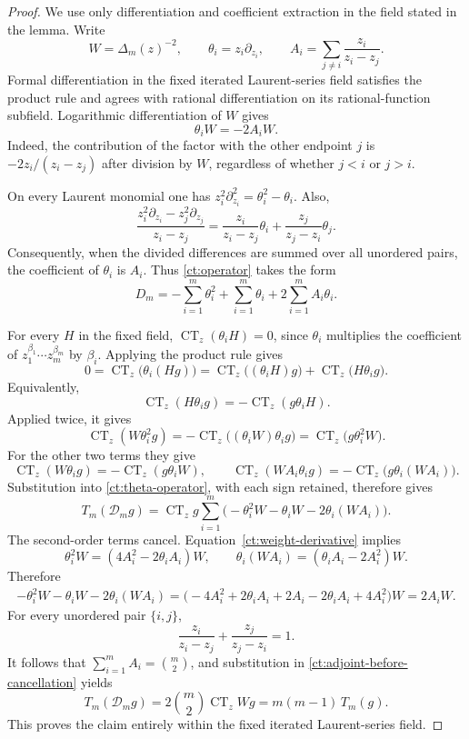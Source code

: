 \documentclass[reqno, 12pt]{article}
\numberwithin{equation}{section}
\theoremstyle{definition}
\DeclareMathOperator{\CT}{CT}
\begin{document}
\begin{proof}
We use only differentiation and coefficient extraction in the
field stated in the lemma.  Write
\[
 W=\Delta_m(z)^{-2},\qquad
 \theta_i=z_i\partial_{z_i},\qquad
 A_i=\sum_{j\ne i}\frac{z_i}{z_i-z_j}.
\]
Formal differentiation in the fixed iterated Laurent-series field
satisfies the product rule and agrees with rational differentiation
on its rational-function subfield.  Logarithmic differentiation of
$W$ gives
\begin{equation}\label{ct:weight-derivative}
 \theta_iW=-2A_iW.
\end{equation}
Indeed, the contribution of the factor with the other endpoint
$j$ is $-2z_i/(z_i-z_j)$ after division by $W$, regardless of
whether $j<i$ or $j>i$.

On every Laurent monomial one has
$z_i^2\partial_{z_i}^2=\theta_i^2-\theta_i$.  Also,
\[
 \frac{z_i^2\partial_{z_i}-z_j^2\partial_{z_j}}{z_i-z_j}
 =\frac{z_i}{z_i-z_j}\theta_i
  +\frac{z_j}{z_j-z_i}\theta_j.
\]
Consequently, when the divided differences are summed over all
unordered pairs, the coefficient of $\theta_i$ is $A_i$.
Thus \eqref{ct:operator} takes the form
\begin{equation}\label{ct:theta-operator}
D_m=-\sum_{i=1}^m\theta_i^2+\sum_{i=1}^m\theta_i+2\sum_{i=1}^mA_i\theta_i.
\end{equation}

For every $H$ in the fixed field, $\CT_z(\theta_iH)=0$, since
$\theta_i$ multiplies the coefficient of
$z_1^{\beta_1}\cdots z_m^{\beta_m}$ by $\beta_i$.
Applying the product rule gives
\[
 0=\CT_z\bigl(\theta_i(Hg)\bigr)
  =\CT_z\bigl((\theta_iH)g\bigr)
   +\CT_z\bigl(H\theta_i g\bigr).
\]
Equivalently,
\[
 \CT_z(H\theta_i g)=-\CT_z(g\theta_iH).
\]
Applied twice, it gives
\[
 \CT_z(W\theta_i^2g)
 =-\CT_z\bigl((\theta_iW)\theta_i g\bigr)
 =\CT_z\bigl(g\theta_i^2W\bigr).
\]
For the other two terms they give
\[
 \CT_z(W\theta_i g)=-\CT_z(g\theta_iW),
 \qquad
 \CT_z(WA_i\theta_i g)=-\CT_z\bigl(g\theta_i(WA_i)\bigr).
\]
Substitution into \eqref{ct:theta-operator}, with each sign
retained, therefore gives
\begin{equation}\label{ct:adjoint-before-cancellation}
 T_m(\mathcal D_mg)
 =\CT_z g\sum_{i=1}^m
 \bigl(-\theta_i^2W-\theta_iW-2\theta_i(WA_i)\bigr).
\end{equation}
The second-order terms cancel.  Equation~\eqref{ct:weight-derivative} implies
\[
 \theta_i^2W=(4A_i^2-2\theta_iA_i)W,
 \qquad
 \theta_i(WA_i)=(\theta_iA_i-2A_i^2)W.
\]
Therefore
\begin{align*}
-\theta_i^2W-\theta_iW-2\theta_i(WA_i)=\bigl(-4A_i^2+2\theta_iA_i+2A_i-2\theta_iA_i+4A_i^2\bigr)W=2A_iW.
\end{align*}
For every unordered pair $\{i,j\}$,
\[
 \frac{z_i}{z_i-z_j}+\frac{z_j}{z_j-z_i}=1.
\]
It follows that $\sum_{i=1}^mA_i=\binom m2$, and substitution in
\eqref{ct:adjoint-before-cancellation} yields
\[
 T_m(\mathcal D_mg)=2\binom m2\CT_z Wg=m(m-1)\,T_m(g).
\]
This proves the claim entirely within the fixed iterated Laurent-series field.
\end{proof}
\end{document}
